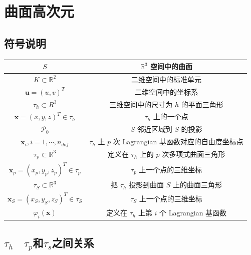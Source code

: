 \documentclass{article}
\begin{document}
\section{曲面高次元}
\subsection{符号说明}
\begin{table}[H]
\begin{center}
\begin{tabular}{|c|c|}
 \hline
 $S$  &$\mathbb R^3$ 空间中的曲面\\
 \hline
 $K\subset \mathbb R^2$  &二维空间中的标准单元\\
 \hline
 $\mathbf u = (u, v)^T$  &二维空间中的坐标系\\
 \hline
 $\tau_h \subset R^3$  &三维空间中的尺寸为 $h$ 的平面三角形\\  
 \hline
 $\mathbf x = (x, y, z)^T\in \tau_h$  &$\tau_h$ 上的一个点\\
 \hline
 $\mathcal P_0$  &$S$ 邻近区域到 $S$ 的投影\\
 \hline
 $\mathbf x_i,  i=1,\cdots, n_{dof}$  &$\tau_h$ 上 $p$ 次 Lagrangian 基函数对应的自由度坐标点\\
 \hline
 $\tau_p\subset \mathbb R^3$ &定义在 $\tau_h$ 上的 $p$ 次多项式曲面三角形\\
 \hline
 $ \mathbf x_p =(x_p, y_p, z_p)^T \in \tau_p$ & $\tau_p$ 上一个点的三维坐标\\
 \hline
 $\tau_S\subset \mathbb R^3$ & 把 $\tau_h$ 投影到曲面 $S$ 上的曲面三角形\\
 \hline
 $ \mathbf x_S =(x_S, y_S, z_S)^T \in \tau_S$ & $\tau_S$ 上一个点的三维坐标 \\
 \hline
 $\varphi_i(\mathbf x)$ & 定义在 $\tau_h$ 上第 $i$ 个 Lagrangian 基函数\\
 \hline 
\end{tabular}
\end{center}
\end{table}

\subsection{$\tau_h$$\quad$$\tau_p$和$\tau_s$之间关系}
\end{document}
